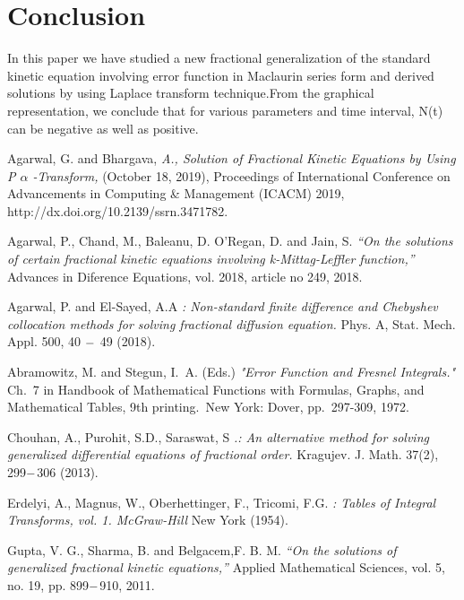 \documentclass{article}
\begin{document}
\section{Conclusion}
In this paper we have studied a new fractional generalization of the standard kinetic equation involving error function in Maclaurin series form and derived solutions by using Laplace transform technique.From the graphical representation, we conclude that for various parameters and time interval, N(t) can be negative as well as positive.
\begin{thebibliography}{9}

    Agarwal, G. and Bhargava,
    \textit{A., Solution of Fractional Kinetic Equations by Using P $\alpha$ -Transform,}
    (October 18, 2019), 
    Proceedings of International Conference on Advancements in Computing \& Management (ICACM) 2019,
    http://dx.doi.org/10.2139/ssrn.3471782.

    Agarwal, P., Chand, M., Baleanu, D. O’Regan, D. and Jain, S.
    \textit{“On the solutions of certain fractional kinetic equations involving k-Mittag-Leffler function,”}
    Advances in Diference Equations, vol. 2018, article no 249, 2018.

    Agarwal, P. and El-Sayed, A.A
    \textit{: Non-standard finite difference and Chebyshev collocation methods for solving fractional diffusion equation.}
    Phys. A, Stat. Mech. Appl. 500, 40 $\--$ 49 (2018).
    
    Abramowitz, M. and Stegun, I. A. (Eds.)
    \textit{"Error Function and Fresnel Integrals."}
    Ch. 7 in  Handbook of Mathematical Functions with Formulas, Graphs, and Mathematical Tables, 9th printing. New York: Dover, pp. 297-309, 1972.

    Chouhan, A., Purohit, S.D., Saraswat, S
    \textit{.: An alternative method for solving generalized differential equations of fractional order.}
    Kragujev. J. Math. 37(2), 299$\--$306 (2013).

    Erdelyi, A., Magnus, W., Oberhettinger, F., Tricomi, F.G.
    \textit{: Tables of Integral Transforms, vol. 1. McGraw-Hill}
    New York (1954).

    Gupta, V. G., Sharma, B. and Belgacem,F. B. M.
    \textit{“On the solutions of generalized fractional kinetic equations,”}
    Applied Mathematical Sciences, vol. 5, no. 19, pp. 899$\--$910, 2011.


\end{thebibliography}
\end{document}
